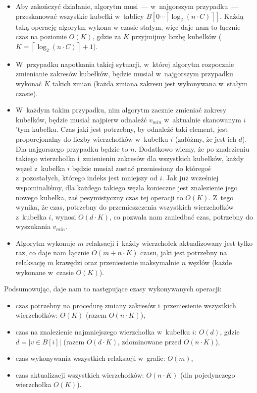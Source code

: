 \begin{itemize}
\item Aby zakończyć działanie, algorytm musi~--- w~najgorszym przypadku~--- przeskanować wszystkie kubełki w~tablicy $B \left[ 0 \cdots \left \lceil \log_{2} \left( n \cdot C \right) \right \rceil \right]$. Każdą taką operację algorytm wykona w czasie stałym, więc daje nam to łącznie czas na poziomie $O \left( K \right)$, gdzie za $K$ przyjmijmy liczbę kubełków ($K = \left \lceil \log_{2} \left( n \cdot C \right) \right \rceil + 1$).
\item W~przypadku napotkania takiej sytuacji, w~której algorytm rozpocznie zmienianie zakresów kubełków, będzie musiał w~najgorszym przypadku wykonać $K$ takich zmian (każda zmiana zakresu jest wykonywana w~stałym czasie).
\item W~każdym takim przypadku, nim algorytm zacznie zmieniać zakresy kubełków, będzie musiał najpierw odnaleźć $v_{min}$ w~aktualnie skanowanym $i$'tym kubełku. Czas jaki jest potrzebny, by odnaleźć taki element, jest proporcjonalny do liczby wierzchołków w~kubełku $i$ (załóżmy, że jest ich $d$). Dla najgorszego przypadku będzie to $n$. Dodatkowo wiemy, że po znalezieniu takiego wierzchołka i~zmienieniu zakresów dla wszystkich kubełków, każdy węzeł z~kubełka $i$ będzie musiał zostać przeniesiony do któregoś z~pozostałych, którego indeks jest mniejszy od $i$. Jak już wcześniej wspominaliśmy, dla każdego takiego węzła konieczne jest znalezienie jego nowego kubełka, zaś pesymistyczny czas tej operacji to $O \left( K \right)$. Z~tego wynika, że czas, potrzebny do przemieszczenia wszystkich wierzchołków z~kubełka $i$, wynosi $ O \left( d \cdot K \right)$, co pozwala nam zaniedbać czas, potrzebny do wyszukania $v_{min}$.
\item Algorytm wykonuje $m$ relaksacji i~każdy wierzchołek aktualizowany jest tylko raz, co daje nam łącznie $O \left( m + n \cdot K \right)$ czasu, jaki jest potrzebny na relaksację $m$ krawędzi oraz przeniesienie maksymalnie $n$ węzłów (każde wykonane w~czasie $O \left( K\right)$).
\end{itemize}

Podsumowując, daje nam to następujące czasy wykonywanych operacji:

\begin{itemize}
\item czas potrzebny na procedurę zmiany zakresów i~przeniesienie wszystkich wierzchołków: $ O \left( K \right)$ (razem $ O \left( n \cdot K \right)$),
\item czas na znalezienie najmniejszego wierzchołka w~kubełku $i$: $ O \left( d \right)$, gdzie $d = \left| v \in B \left[ i\right] \right|$ (razem $ O \left( d \cdot K \right)$, zdominowane przed $ O \left( n \cdot K \right)$),
\item czas wykonywania wszystkich relaksacji w~grafie: $ O \left( m \right) $,
\item czas aktualizacji wszystkich wierzchołków: $ O \left( n \cdot K \right)$ (dla pojedynczego wierzchołka $O \left( K\right)$).
\end{itemize}

